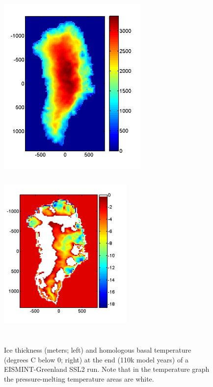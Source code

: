 \documentclass[11pt,final]{amsart}
\begin{document}
\begin{figure}[ht]
\includegraphics[height=3.5in]{figs/greenH_SSL2}\qquad\includegraphics[height=3.5in,width=2.6in]{figs/greenThomol_SSL2}%
\caption{Ice thickness (meters; left) and homologous basal temperature (degrees C below 0; right) at the end (110k model years) of a EISMINT-Greenland SSL2 run.  Note that in the temperature graph the pressure-melting temperature areas are white.}
\label{fig:ssl2thickThomol}
\end{figure}
\end{document}
